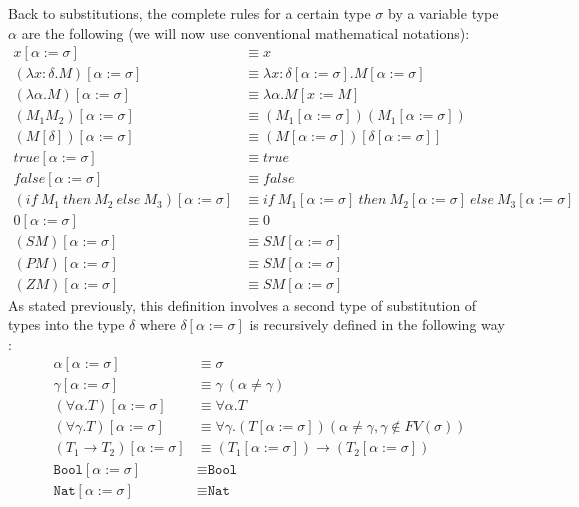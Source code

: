 \documentclass{article}
\begin{document}
    Back to substitutions, the complete rules for a certain type $\sigma$ by a variable type $\alpha$ are the following (we will now use conventional mathematical notations):
    \label{substitution2}\begin{align*}
            x[\alpha:=\sigma] &\equiv x\\
            (\lambda x : \delta .M)[\alpha:=\sigma] &\equiv \lambda x : \delta [\alpha:=\sigma] .M[\alpha:=\sigma] \\
            (\lambda \alpha .M)[\alpha:=\sigma] &\equiv \lambda \alpha .M[x:=M]\\
            (M_1 M_2)[\alpha:=\sigma] &\equiv (M_1[\alpha:=\sigma])(M_1[\alpha:=\sigma])\\
            (M [\delta])[\alpha:=\sigma] &\equiv (M[\alpha:=\sigma])[\delta[\alpha:=\sigma]]\\
            true[\alpha:=\sigma] &\equiv true\\
            false[\alpha:=\sigma] &\equiv false\\
            (if \ M_1 \ then \ M_2 \ else \ M_3)[\alpha:=\sigma] &\equiv if \ M_1[\alpha:=\sigma] \ then \ M_2[\alpha:=\sigma] \ else \ M_3[\alpha:=\sigma]\\
            0[\alpha:=\sigma] &\equiv 0\\
            (S M)[\alpha:=\sigma] &\equiv S M[\alpha:=\sigma]\\
            (P M)[\alpha:=\sigma] &\equiv S M[\alpha:=\sigma]\\
            (Z M)[\alpha:=\sigma] &\equiv S M[\alpha:=\sigma]
        \end{align*}
    As stated previously, this definition involves a second type of substitution of types into the type $\delta$ where $\delta[\alpha:=\sigma]$ is recursively defined in the following way :
    \label{substitution3}\begin{align*}
            \alpha[\alpha:=\sigma] &\equiv \sigma\\
            \gamma[\alpha:=\sigma] &\equiv \gamma \ ( \alpha\neq \gamma)\\
            (\forall \alpha .T)[\alpha:=\sigma] &\equiv \forall \alpha .T \\
            (\forall \gamma .T)[\alpha:=\sigma] &\equiv \forall \gamma .(T[\alpha:=\sigma])  (\alpha \neq \gamma,\gamma \not\in FV(\sigma)) \\
            (T_1 \rightarrow T_2)[\alpha:=\sigma] &\equiv (T_1[\alpha:=\sigma]) \rightarrow (T_2[\alpha:=\sigma])\\
            \texttt{Bool}[\alpha:=\sigma] &\equiv \texttt{Bool}\\
            \texttt{Nat}[\alpha:=\sigma] &\equiv \texttt{Nat}
        \end{align*}
\end{document}
